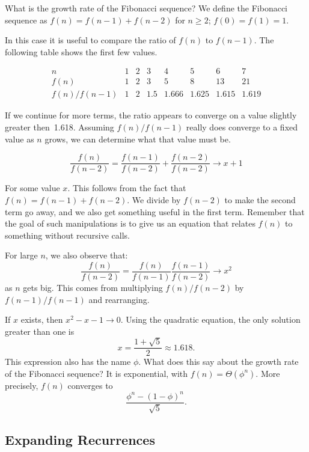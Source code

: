 \begin{example}
What is the growth rate of the Fibonacci sequence?
We define the Fibonacci sequence as
\(f(n) = f(n-1) + f(n-2)\) for \(n \geq 2\); \(f(0) = f(1) = 1\).

In this case it is useful to compare the ratio of \(f(n)\) to
\(f(n-1)\).
The following table shows the first few values.

{\small
\[\begin{array}{c|lllllll}
n&1&2&3&4&5&6&7\\
\hline
f(n)&1&2&3&5&8&13&21\\
f(n)/f(n-1)&1&2&1.5&1.666&1.625&1.615&1.619
\end{array}\]
}

If we continue for more terms, the ratio appears to converge on a
value slightly greater then~1.618.
Assuming \(f(n)/f(n-1)\) really does converge to a fixed value as
\(n\) grows, we can determine what that value must be.

\[\frac{f(n)}{f(n-2)} = \frac{f(n-1)}{f(n-2)} + \frac{f(n-2)}{f(n-2)}
\rightarrow x+1\]

\noindent For some value \(x\).
This follows from the fact that \(f(n) = f(n-1) + f(n-2)\).
We divide by \(f(n-2)\) to make the second term go away, and we also
get something useful in the first term.
Remember that the goal of such manipulations is to give us an equation
that relates \(f(n)\) to something without recursive calls.

For large \(n\), we also observe that:
\[\frac{f(n)}{f(n-2)} = \frac{f(n)}{f(n-1)}\frac{f(n-1)}{f(n-2)}
\rightarrow x^2\]
\noindent as \(n\) gets big.
This comes from multiplying \(f(n)/f(n-2)\) by \(f(n-1)/f(n-1)\) and
rearranging.

If \(x\) exists, then \(x^2 - x - 1 \rightarrow 0\).
Using the quadratic equation, the only solution greater than one is
\[x = \frac{1 + \sqrt{5}}{2} \approx 1.618.\]
This expression also has the name \(\phi\).
What does this say about the growth rate of the Fibonacci sequence?
It is exponential, with \(f(n) = \Theta(\phi^n)\).
More precisely, \(f(n)\) converges to
\[\frac{\phi^n - (1 - \phi)^n}{\sqrt{5}}.\]
\end{example}


\subsection{Expanding Recurrences}


